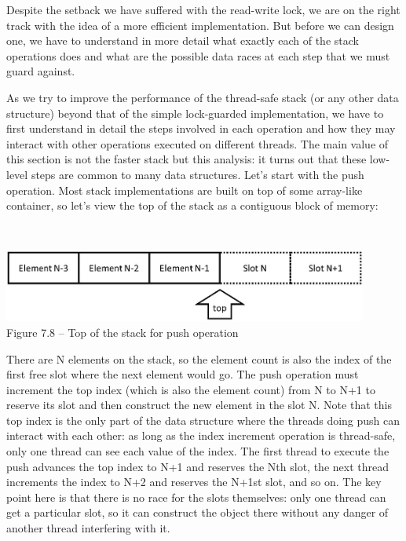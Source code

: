 Despite the setback we have suffered with the read-write lock, we are on the right track with the idea of a more efficient implementation. But before we can design one, we have to understand in more detail what exactly each of the stack operations does and what are the possible data races at each step that we must guard against.


As we try to improve the performance of the thread-safe stack (or any other data structure) beyond that of the simple lock-guarded implementation, we have to first understand in detail the steps involved in each operation and how they may interact with other operations executed on different threads. The main value of this section is not the faster stack but this analysis: it turns out that these low-level steps are common to many data structures. Let's start with the push operation. Most stack implementations are built on top of some array-like container, so let's view the top of the stack as a contiguous block of memory:

\hspace*{\fill} \\ %
\begin{center}
\includegraphics[width=0.9\textwidth]{content/2/chapter7/images/8.jpg}\\
Figure 7.8 – Top of the stack for push operation
\end{center}

There are N elements on the stack, so the element count is also the index of the first free slot where the next element would go. The push operation must increment the top index (which is also the element count) from N to N+1 to reserve its slot and then construct the new element in the slot N. Note that this top index is the only part of the data structure where the threads doing push can interact with each other: as long as the index increment operation is thread-safe, only one thread can see each value of the index. The first thread to execute the push advances the top index to N+1 and reserves the Nth slot, the next thread increments the index to N+2 and reserves the N+1st slot, and so on. The key point here is that there is no race for the slots themselves: only one thread can get a particular slot, so it can construct the object there without any danger of another thread interfering with it.

